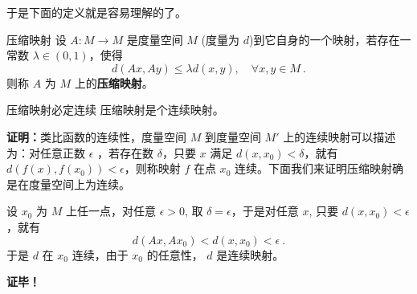 于是下面的定义就是容易理解的了。
\begin{definition}{压缩映射}
设 $A:M\rightarrow M$ 是度量空间 $M$ (度量为 $d$)到它自身的一个映射，若存在一常数 $\lambda\in(0,1)$，使得
\begin{equation}
d(Ax,Ay)\leq \lambda d(x,y),\quad \forall x,y\in M~.
\end{equation}
 则称 $A$ 为 $M$ 上的\textbf{压缩映射}。
\end{definition}
\begin{theorem}{压缩映射必定连续}
压缩映射是个连续映射。
\end{theorem}
\textbf{证明：}类比函数的连续性，度量空间 $M$ 到度量空间 $M'$ 上的连续映射可以描述为：对任意正数 $\epsilon$ ，若存在数 $\delta$，只要 $x$ 满足 $d(x,x_0)<\delta$，就有 $d(f(x),f(x_0))<\epsilon$，则称映射 $f$ 在点 $x_0$ 连续。下面我们来证明压缩映射确是在度量空间上为连续。

设 $x_0$ 为 $M$ 上任一点，对任意 $\epsilon>0$, 取 $\delta=\epsilon$，于是对任意 $x$, 只要 $d(x,x_0)<\epsilon$，就有
\begin{equation}
d(A x,A x_0)<d(x,x_0)<\epsilon~.
\end{equation}
于是 $d$ 在 $x_0$ 连续，由于 $x_0$ 的任意性， $d$ 是连续映射。



\textbf{证毕！}